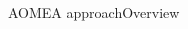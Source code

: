 \begin{frame}{AOMEA approach}{Overview}
\begin{columns}
        \begin{column}{0.4\textwidth}
            \centering
        \end{column}

    \end{columns}

\end{frame}

